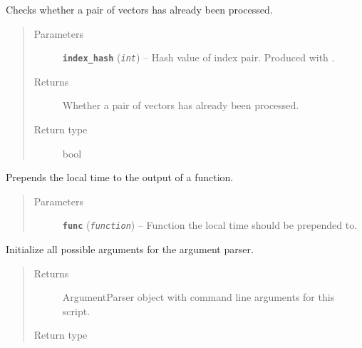 \documentclass[letterpaper,10pt,english]{sphinxmanual}
\begin{document}
\begin{fulllineitems}

\begin{fulllineitems}
\label{src.mapping:src.mapping.mapthreading.VectorDict.skippable}
Checks whether a pair of vectors has already been processed.
\begin{quote}\begin{description}
\item[{Parameters}] \leavevmode
\textbf{\texttt{index\_hash}} (\emph{\texttt{int}}) -- Hash value of index pair. Produced with .

\item[{Returns}] \leavevmode
Whether a pair of vectors has already been processed.

\item[{Return type}] \leavevmode
bool

\end{description}\end{quote}

\end{fulllineitems}


\end{fulllineitems}


\begin{fulllineitems}
\label{src.mapping:src.mapping.mapthreading.alt}
Prepends the local time to the output of a function.
\begin{quote}\begin{description}
\item[{Parameters}] \leavevmode
\textbf{\texttt{func}} (\emph{\texttt{function}}) -- Function the local time should be prepended to.

\end{description}\end{quote}

\end{fulllineitems}


\begin{fulllineitems}
\label{src.mapping:src.mapping.mapthreading.init_argparse}
Initialize all possible arguments for the argument parser.
\begin{quote}\begin{description}
\item[{Returns}] \leavevmode
ArgumentParser object with command line arguments for this script.

\item[{Return type}] \leavevmode
{}

\end{description}\end{quote}

\end{fulllineitems}
\end{document}
